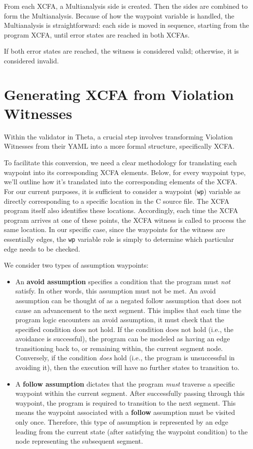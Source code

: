 From each XCFA, a Multianalysis side is created. Then the sides are combined to form the Multianalysis. 
Because of how the waypoint variable is handled, the Multianalysis is straightforward: each side 
is moved in sequence, starting from the program XCFA, until error states are reached in both XCFAs.

If both error states are reached, the witness is considered valid; otherwise, it is considered invalid.

\section{Generating XCFA from Violation Witnesses}
Within the validator in Theta, a crucial step involves transforming Violation Witnesses 
from their YAML into a more formal structure, specifically XCFA.

To facilitate this conversion, we need a clear methodology for translating each waypoint into 
its corresponding XCFA elements. Below, for every waypoint type, we'll outline how it's translated into 
the corresponding elements of the XCFA.
For our current purposes, it is sufficient to consider a waypoint (\texttt{wp}) variable as directly corresponding 
to a specific location in the C source file. The XCFA program itself also identifies these locations. 
Accordingly, each time the XCFA program arrives at one of these points, the XCFA witness
is called to process the same location. 
In our specific case, since the waypoints for the witness are essentially edges, the \texttt{wp} 
variable role is simply to determine which particular edge needs to be checked.

We consider two types of assumption waypoints:
\begin{itemize}
  \item An \textbf{avoid assumption} specifies a condition that the program must 
    \textit{not} satisfy. In other words, this assumption must not be met.
    An avoid assumption can be thought of as a negated follow assumption that 
    does not cause an advancement to the next segment.
    This implies that each time the program logic encounters an avoid assumption, 
    it must check that the specified condition does not hold.
    If the condition does not hold (i.e., the avoidance is successful), the program can 
    be modeled as having an edge transitioning back to, or remaining within, the current segment node.
    Conversely, if the condition \emph{does} hold (i.e., the program is unsuccessful in avoiding it), 
    then the execution will have no further states to transition to.
  \item A \textbf{follow assumption} dictates that the program \textit{must} 
    traverse a specific waypoint within the current segment.
    After successfully passing through this waypoint, the program is required to transition 
    to the next segment. This means the waypoint associated with a \textbf{follow} assumption 
    must be visited only once.
    Therefore, this type of assumption is represented by an edge leading from the current 
    state (after satisfying the waypoint condition) to the node representing the subsequent segment.
\end{itemize}


